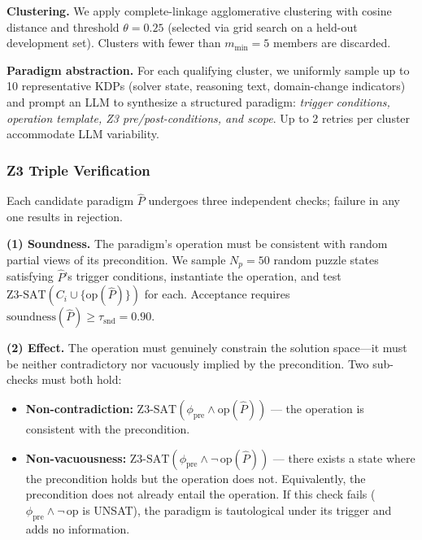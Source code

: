\textbf{Clustering.} We apply complete-linkage agglomerative clustering with cosine distance and threshold $\theta = 0.25$ (selected via grid search on a held-out development set). Clusters with fewer than $m_{\min} = 5$ members are discarded.

\textbf{Paradigm abstraction.} For each qualifying cluster, we uniformly sample up to 10 representative KDPs (solver state, reasoning text, domain-change indicators) and prompt an LLM to synthesize a structured paradigm: \textit{trigger conditions, operation template, Z3 pre/post-conditions, and scope}. Up to 2 retries per cluster accommodate LLM variability.

\subsubsection{Z3 Triple Verification}
\label{ssec:verification}

Each candidate paradigm $\hat{P}$ undergoes three independent checks; failure in any one results in rejection.

\textbf{(1) Soundness.} The paradigm's operation must be consistent with random partial views of its precondition. We sample $N_p = 50$ random puzzle states satisfying $\hat{P}$'s trigger conditions, instantiate the operation, and test $\text{Z3-SAT}(C_i \cup \{\text{op}(\hat{P})\})$ for each. Acceptance requires $\text{soundness}(\hat{P}) \geq \tau_{\text{snd}} = 0.90$.

\textbf{(2) Effect.} The operation must genuinely constrain the solution space—it must be neither contradictory nor vacuously implied by the precondition. Two sub-checks must both hold:
\begin{itemize}
    \item \textbf{Non-contradiction:} $\text{Z3-SAT}(\phi_{\text{pre}} \wedge \text{op}(\hat{P}))$ — the operation is consistent with the precondition.
    \item \textbf{Non-vacuousness:} $\text{Z3-SAT}(\phi_{\text{pre}} \wedge \neg\,\text{op}(\hat{P}))$ — there exists a state where the precondition holds but the operation does not. Equivalently, the precondition does not already entail the operation. If this check fails ($\phi_{\text{pre}} \wedge \neg\,\text{op}$ is UNSAT), the paradigm is tautological under its trigger and adds no information.
\end{itemize}


